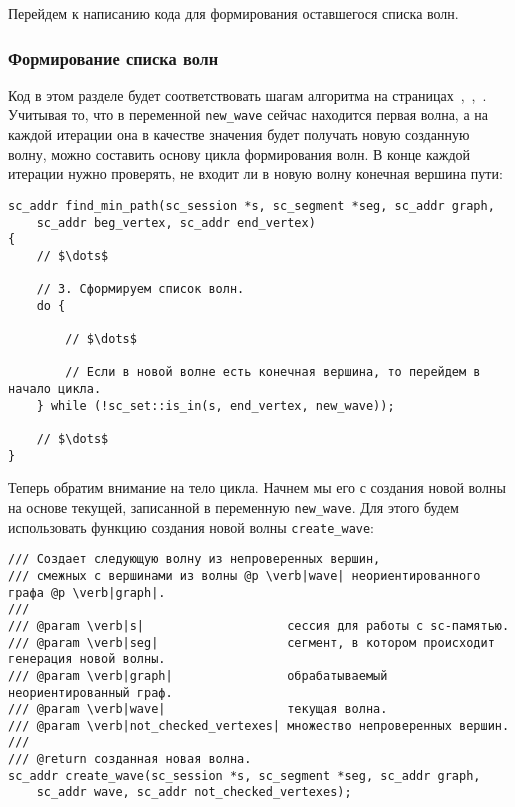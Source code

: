 Перейдем к написанию кода для формирования оставшегося списка волн.

\subsubsection{Формирование списка волн}
\label{sec:libscprg_fmp_waves_list}

Код в этом разделе будет соответствовать шагам алгоритма на
страницах~\pageref{astep:S4_Create_next_wave},~\pageref{astep:S5_Create_next_wave},~\pageref{astep:S6_Create_last_wave}.
Учитывая то, что в переменной \lstinline|new_wave| сейчас находится
первая волна, а на каждой итерации она в качестве значения будет
получать новую созданную волну, можно составить основу цикла
формирования волн. В конце каждой итерации нужно проверять, не входит
ли в новую волну конечная вершина пути:
\begin{lstlisting}[texcl]
sc_addr find_min_path(sc_session *s, sc_segment *seg, sc_addr graph,
    sc_addr beg_vertex, sc_addr end_vertex)
{
    // $\dots$

    // 3. Сформируем список волн.
    do {

        // $\dots$

        // Если в новой волне есть конечная вершина, то перейдем в начало цикла.
    } while (!sc_set::is_in(s, end_vertex, new_wave));

    // $\dots$
}
\end{lstlisting}

Теперь обратим внимание на тело цикла. Начнем мы его с создания новой
волны на основе текущей, записанной в переменную
\lstinline|new_wave|. Для этого будем использовать функцию создания
новой волны \lstinline|create_wave|:
\begin{lstlisting}[texcl]
/// Создает следующую волну из непроверенных вершин,
/// смежных с вершинами из волны @p \verb|wave| неориентированного графа @p \verb|graph|.
///
/// @param \verb|s|                    сессия для работы с sc-памятью.
/// @param \verb|seg|                  сегмент, в котором происходит генерация новой волны.
/// @param \verb|graph|                обрабатываемый неориентированный граф.
/// @param \verb|wave|                 текущая волна.
/// @param \verb|not_checked_vertexes| множество непроверенных вершин.
///
/// @return созданная новая волна.
sc_addr create_wave(sc_session *s, sc_segment *seg, sc_addr graph,
    sc_addr wave, sc_addr not_checked_vertexes);
\end{lstlisting}

